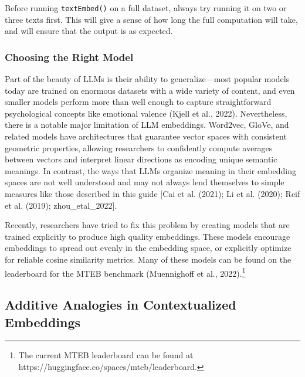 \documentclass[
  man,
  floatsintext,
  longtable,
  nolmodern,
  notxfonts,
  notimes,
  colorlinks=true,linkcolor=blue,citecolor=blue,urlcolor=blue]{apa7}
\begin{document}
Before running \texttt{textEmbed()} on a full dataset, always try
running it on two or three texts first. This will give a sense of how
long the full computation will take, and will ensure that the output is
as expected.

\subsubsection{Choosing the Right Model}\label{choosing-the-right-model}

Part of the beauty of LLMs is their ability to generalize---most popular
models today are trained on enormous datasets with a wide variety of
content, and even smaller models perform more than well enough to
capture straightforward psychological concepts like emotional valence
(Kjell et al., 2022). Nevertheless, there is a notable major limitation
of LLM embeddings. Word2vec, GloVe, and related models have
architectures that guarantee vector spaces with consistent geometric
properties, allowing researchers to confidently compute averages between
vectors and interpret linear directions as encoding unique semantic
meanings. In contrast, the ways that LLMs organize meaning in their
embedding spaces are not well understood and may not always lend
themselves to simple measures like those described in this guide {[}Cai
et al. (2021); Li et al. (2020); Reif et al. (2019);
zhou\_etal\_2022{]}.

Recently, researchers have tried to fix this problem by creating models
that are trained explicitly to produce high quality embeddings. These
models encourage embeddings to spread out evenly in the embedding space,
or explicitly optimize for reliable cosine similarity metrics. Many of
these models can be found on the leaderboard for the MTEB benchmark
(Muennighoff et al., 2022).\footnote{The current MTEB leaderboard can be
  found at https://huggingface.co/spaces/mteb/leaderboard.}

\subsection{Additive Analogies in Contextualized
Embeddings}\label{additive-analogies-in-contextualized-embeddings}
\end{document}
